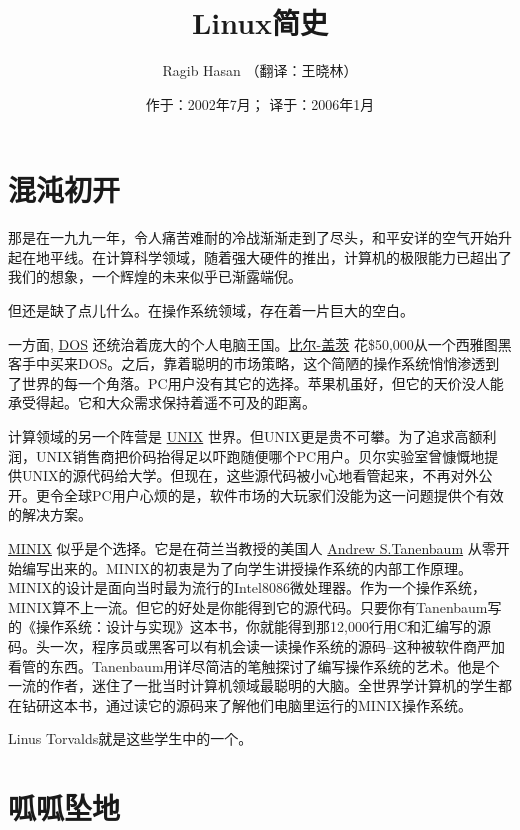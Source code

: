 \documentclass[12pt,a4paper]{article}
\title{Linux简史}
\author{Ragib Hasan （翻译：王晓林）}
\date{作于：2002年7月； 译于：2006年1月}
\begin{document}
\maketitle

\setcounter{tocdepth}{2}
\tableofcontents
\vspace*{1cm}

\clearpage
\section{混沌初开}
\label{sec-1}

  那是在一九九一年，令人痛苦难耐的冷战渐渐走到了尽头，和平安详的空气开始升起在地平线。在计算科学领域，随着强大硬件的推出，计算机的极限能力已超出了我们的想象，一个辉煌的未来似乎已渐露端倪。
  
  但还是缺了点儿什么。在操作系统领域，存在着一片巨大的空白。

  一方面, \href{http://en.wikipedia.org/wiki/MS-DOS}{DOS} 还统治着庞大的个人电脑王国。\href{http://en.wikipedia.org/wiki/Bill_Gates}{比尔-盖茨} 花\$50,000从一个西雅图黑客手中买来DOS。之后，靠着聪明的市场策略，这个简陋的操作系统悄悄渗透到了世界的每一个角落。PC用户没有其它的选择。苹果机虽好，但它的天价没人能承受得起。它和大众需求保持着遥不可及的距离。

  计算领域的另一个阵营是 \href{http://en.wikipedia.org/wiki/UNIX}{UNIX} 世界。但UNIX更是贵不可攀。为了追求高额利润，UNIX销售商把价码抬得足以吓跑随便哪个PC用户。贝尔实验室曾慷慨地提供UNIX的源代码给大学。但现在，这些源代码被小心地看管起来，不再对外公开。更令全球PC用户心烦的是，软件市场的大玩家们没能为这一问题提供个有效的解决方案。

  \href{http://en.wikipedia.org/wiki/MINIX}{MINIX} 似乎是个选择。它是在荷兰当教授的美国人 \href{http://cs.vu.nl/~ast}{Andrew S.Tanenbaum} 从零开始编写出来的。MINIX的初衷是为了向学生讲授操作系统的内部工作原理。MINIX的设计是面向当时最为流行的Intel8086微处理器。作为一个操作系统，MINIX算不上一流。但它的好处是你能得到它的源代码。只要你有Tanenbaum写的《操作系统：设计与实现》这本书，你就能得到那12,000行用C和汇编写的源码。头一次，程序员或黑客可以有机会读一读操作系统的源码--这种被软件商严加看管的东西。Tanenbaum用详尽简洁的笔触探讨了编写操作系统的艺术。他是个一流的作者，迷住了一批当时计算机领域最聪明的大脑。全世界学计算机的学生都在钻研这本书，通过读它的源码来了解他们电脑里运行的MINIX操作系统。

  Linus Torvalds就是这些学生中的一个。
\section{呱呱坠地}
\label{sec-2}
\end{document}
